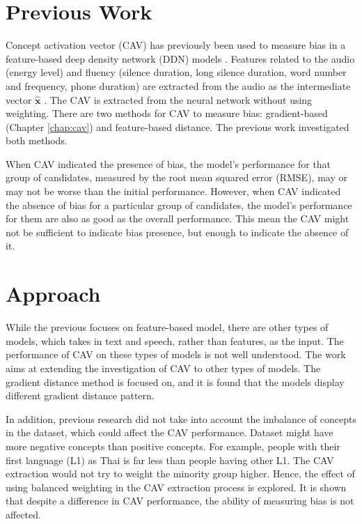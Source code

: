 \section{Previous Work}
Concept activation vector (CAV)  has previously been used to measure bias in a feature-based deep density network (DDN)  models \cite{feature_bias}. Features related to the audio (energy level) and fluency (silence duration, long silence duration, word number and frequency, phone duration) are extracted from the audio as the intermediate vector $\mathbf{\hat{x}}$ \cite{feature_vector_old}. The CAV is extracted from the neural network without using weighting. There are two methods for CAV to measure bias: gradient-based (Chapter \ref{chap:cav}) and feature-based distance. The previous work investigated both methods.


When CAV indicated the presence of bias, the model's performance for that group of candidates, measured by the root mean squared error (RMSE),  may or may not be worse than the initial performance. However, when CAV indicated the absence of bias for a particular group of candidates, the model's performance for them are also as good as the overall performance. This mean the CAV might not be sufficient to indicate bias presence, but enough to indicate the absence of it.

\section{Approach}
While the previous focuses on feature-based model, there are other types of models, which takes in text and speech, rather than features, as the input. The performance of CAV on these types of models is not well understood. The work aims at extending the investigation of CAV to other types of models. The gradient distance method is focused on, and it is found that the models display different gradient distance pattern.

In addition, previous research did not take into account the imbalance of concepts in the dataset, which could affect the CAV performance. Dataset might have more negative concepts than positive concepts. For example, people with their first language (L1)  as Thai is far less than people having other L1. The CAV extraction would not try to weight the minority group higher. Hence, the effect of using balanced weighting in the CAV extraction process is explored. It is shown that despite a difference in CAV performance, the ability of measuring bias is not affected.

